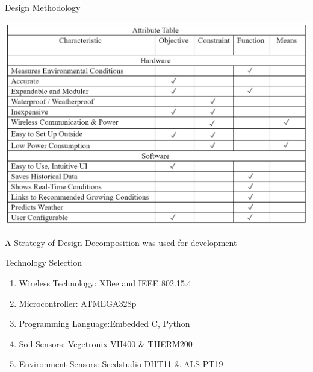 \documentclass{beamer}
\begin{document}
\begin{frame}{Design Methodology}
    \begin{center}
        \includegraphics[width=0.7\linewidth]{PNGs/AttributeTable.PNG}
    \end{center}
    A Strategy of Design Decomposition was used for development
\end{frame}


\begin{frame}{Technology Selection}

    \begin{enumerate}
        \setlength{\itemsep}{15pt}
        \item
              Wireless Technology: \quad\quad\quad XBee and IEEE 802.15.4
        \item
              Microcontroller: \quad\quad\quad\quad\quad ATMEGA328p
        \item
              Programming Language:\quad\quad Embedded C, Python
        \item
              Soil Sensors: \quad\quad\quad\quad\quad\quad\: Vegetronix VH400 \& THERM200
        \item
              Environment Sensors: \quad\quad\quad Seedstudio DHT11 \& ALS-PT19
    \end{enumerate}

\end{frame}
\end{document}
